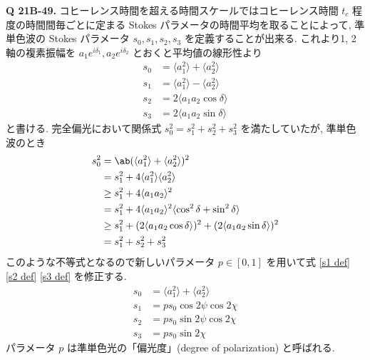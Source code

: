 \documentclass[uplatex,dvipdfmx,a4paper,11pt]{jlreq}
\theoremstyle{definition}
\begin{document}
\textbf{Q 21B-49.}
コヒーレンス時間を超える時間スケールではコヒーレンス時間 $t_c$ 程度の時間間毎ごとに定まる Stokes パラメータの時間平均を取ることによって, 準単色波の Stokes パラメータ $s_0, s_1, s_2, s_3$ を定義することが出来る. これより1, 2軸の複素振幅を $a_1e^{i\delta_1}, a_2e^{i\delta_2}$ とおくと平均値の線形性より
\begin{align}
  s_0 & = \langle a_1^2\rangle + \langle a_2^2\rangle \\
  s_1 & = \langle a_1^2\rangle - \langle a_2^2\rangle \\
  s_2 & = 2\langle a_1a_2\cos\delta\rangle            \\
  s_3 & = 2\langle a_1a_2\sin\delta\rangle
\end{align}
と書ける. 完全偏光において関係式 $s_0^2 = s_1^2 + s_2^2 + s_3^2$ を満たしていたが, 準単色波のとき
\begin{align}
  s_0^2 & = \ab(\langle a_1^2\rangle + \langle a_2^2\rangle)^2                                     \\
        & = s_1^2 + 4\langle a_1^2\rangle\langle a_2^2\rangle                                      \\
        & \geq s_1^2 + 4\langle a_1a_2\rangle^2                                                    \\
        & = s_1^2 + 4\langle a_1a_2\rangle^2\langle\cos^2\delta + \sin^2\delta\rangle              \\
        & \geq s_1^2 + (2\langle a_1a_2\cos\delta\rangle)^2 + (2\langle a_1a_2\sin\delta\rangle)^2 \\
        & = s_1^2 + s_2^2 + s_3^2
\end{align}
このような不等式となるので新しいパラメータ $p\in[0,1]$ を用いて式 \eqref{s1 def} \eqref{s2 def} \eqref{s3 def} を修正する.
\begin{align}
  s_0 & = \langle a_1^2\rangle + \langle a_2^2\rangle \\
  s_1 & = ps_0\cos2\psi\cos2\chi                      \\
  s_2 & = ps_0\sin2\psi\cos2\chi                      \\
  s_3 & = ps_0\sin2\chi
\end{align}
パラメータ $p$ は準単色光の「偏光度」(degree of polarization) と呼ばれる.
\end{document}
